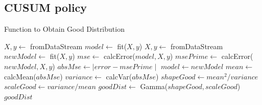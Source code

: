 \documentclass{mpaper}
\begin{document}
\begin{appendix}
\section{CUSUM policy}\label{gooddist}
\begin{algorithm}[h]
\caption{Function to Obtain Good Distribution}
\begin{algorithmic}
    \State $X, y \gets$ fromDataStream
    \State $model \gets$ fit($X,y$)
        \State $X, y \gets$ fromDataStream
        \State $newModel \gets$ fit($X,y$)
        \State $mse \gets$ calcError($model,X,y$)
        \State $msePrime \gets$ calcError($newModel,X,y$)
        \State $absMse \gets \mid error - msePrime \mid$
        \State $model \gets newModel$
    \EndFor
    \State $mean \gets$ calcMean($absMse$)
    \State $variance \gets$ calcVar($absMse$)
    \State $shapeGood \gets mean^2/variance$
    \State $scaleGood \gets variance/mean$
    \State $goodDist \gets$ Gamma($shapeGood, scaleGood$)\\
    \Return $goodDist$
\EndFunction
\end{algorithmic}
\end{algorithm}
\pagebreak
\end{appendix}
\end{document}
